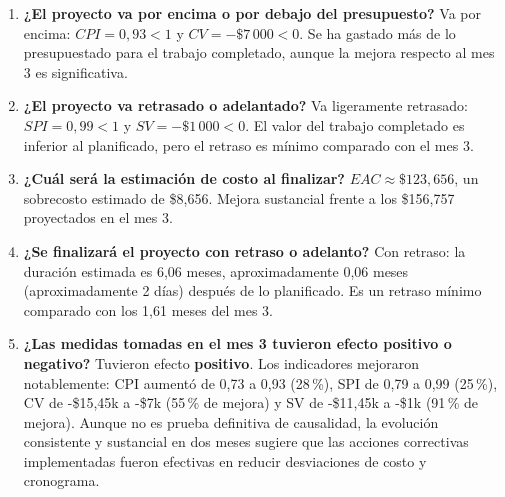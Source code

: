 \documentclass[12pt,letterpaper]{article}
\begin{document}
\begin{enumerate}
  \item \textbf{¿El proyecto va por encima o por debajo del presupuesto?}
  Va por encima: $CPI=0{,}93<1$ y $CV=-\$7\,000<0$. Se ha gastado más de lo
  presupuestado para el trabajo completado, aunque la mejora respecto al mes 3
  es significativa.

  \item \textbf{¿El proyecto va retrasado o adelantado?}
  Va ligeramente retrasado: $SPI=0{,}99<1$ y $SV=-\$1\,000<0$. El valor del
  trabajo completado es inferior al planificado, pero el retraso es mínimo
  comparado con el mes 3.

  \item \textbf{¿Cuál será la estimación de costo al finalizar?}
  $EAC\approx\$123{,}656$, un sobrecosto estimado de \$8{,}656. Mejora
  sustancial frente a los \$156{,}757 proyectados en el mes 3.

  \item \textbf{¿Se finalizará el proyecto con retraso o adelanto?}
  Con retraso: la duración estimada es 6,06 meses, aproximadamente 0,06 meses
  (aproximadamente 2 días) después de lo planificado. Es un retraso mínimo
  comparado con los 1,61 meses del mes 3.

  \item \textbf{¿Las medidas tomadas en el mes 3 tuvieron efecto positivo o
  negativo?}
  Tuvieron efecto \textbf{positivo}. Los indicadores mejoraron notablemente:
  CPI aumentó de 0,73 a 0,93 (28\,\%), SPI de 0,79 a 0,99 (25\,\%), CV de
  -\$15{,}45k a -\$7k (55\,\% de mejora) y SV de -\$11{,}45k a -\$1k (91\,\%
  de mejora). Aunque no es prueba definitiva de causalidad, la evolución
  consistente y sustancial en dos meses sugiere que las acciones correctivas
  implementadas fueron efectivas en reducir desviaciones de costo y cronograma.
\end{enumerate}
\end{document}
